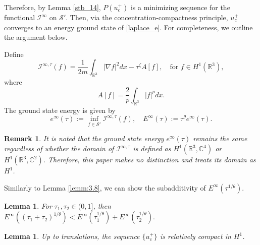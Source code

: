 \documentclass{amsart}
\theoremstyle{plain}
\newtheorem{lemma}[theorem]{Lemma}
\newtheorem{remark}[theorem]{Remark}
\theoremstyle{definition}
\theoremstyle{remark}
\numberwithin{equation}{section} \numberwithin{figure}{section}
\begin{document}
Therefore, by Lemma \ref{stb_14}, \( P(u_c^+) \) is a minimizing sequence for the functional \( \mathcal{I}^{\infty} \) on \( \mathcal{S}' \). Then, via the concentration-compactness principle, \( u_c^+ \) converges to an energy ground state of \eqref{laplace_e}. For completeness, we outline the argument below.

Define
\[
\mathcal{I}^{\infty,\tau}(f) = \frac{1}{2m} \int_{\mathbb{R}^3} |\nabla f|^2  dx - \tau^\zeta A[f], \quad \text{for } f \in H^1(\mathbb{R}^3),
\]
where
\[
A[f] = \frac{2}{p} \int_{\mathbb{R}^3} |f|^p  dx.
\]
The ground state energy is given by
\[
e^{\infty}(\tau) := \inf_{f \in \mathcal{S}'} \mathcal{I}^{\infty,\tau}(f), \quad E^{\infty}(\tau) := \tau^{\theta} e^{\infty}(\tau).
\]



\begin{remark}
  It is noted that the ground state energy $e^{\infty}(\tau)$ remains 
the same regardless of whether the domain of $\mathcal{I}^{\infty,\tau}$ is defined as 
$H^1(\mathbb{R}^3, \mathbb{C}^4)$ or $H^1(\mathbb{R}^3, \mathbb{C}^2)$. 
Therefore, this paper makes no distinction and treats its domain as $H^1$.
\end{remark}
Similarly to Lemma \ref{lemm:3.8}, we can show the subadditivity of $E^{\infty}(\tau^{1/\theta})$.
\begin{lemma}\label{subadd}
  For $\tau_1, \tau_2\in (0, 1]$, then $E^{\infty}((\tau_1 + \tau_2)^{1/\theta})< E^{\infty}(\tau_1^{1/\theta}) + E^{\infty}(\tau_2^{1/\theta}).$
\end{lemma}



\begin{lemma}
  Up to translations, the sequence \(\{u_c^+\}\) is relatively compact in \(H^1\).
\end{lemma}
\end{document}
